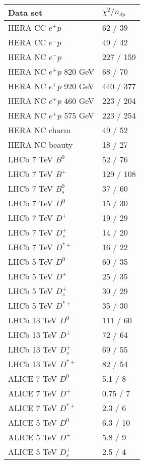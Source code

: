 \begin{table}
\renewcommand*{\arraystretch}{1.12}
    \centering
\begin{tabular}{ll}
    Data set & $\chi^2/n_{dp}$ \\
    \hline
    HERA CC $e^{+}p$ & 62 / 39  \\ 
    HERA CC $e^{-}p$ & 49 / 42  \\ 
    HERA NC $e^{-}p$ & 227 / 159  \\ 
    HERA NC $e^{+}p$ 820 GeV & 68 / 70  \\ 
    HERA NC $e^{+}p$ 920 GeV & 440 / 377  \\ 
    HERA NC $e^{+}p$ 460 GeV & 223 / 204  \\ 
    HERA NC $e^{+}p$ 575 GeV & 223 / 254  \\ 
    HERA NC charm & 49 / 52  \\ 
    HERA NC beauty & 18 / 27  \\ 
    LHCb 7 TeV $B^0$ & 52 / 76  \\ 
    LHCb 7 TeV $B^{+}$ & 129 / 108  \\ 
    LHCb 7 TeV $B^{0}_s$ & 37 / 60  \\ 
    LHCb 7 TeV $D^0$ & 15 / 30  \\ 
    LHCb 7 TeV $D^{+}$ & 19 / 29  \\ 
    LHCb 7 TeV $D^{+}_{s}$ & 14 / 20  \\ 
    LHCb 7 TeV $D^{*+}$ & 16 / 22  \\ 
    LHCb 5 TeV $D^0$ & 60 / 35  \\ 
    LHCb 5 TeV $D^{+}$ & 25 / 35  \\ 
    LHCb 5 TeV $D^{+}_{s}$ & 30 / 29  \\ 
    LHCb 5 TeV $D^{*+}$ & 35 / 30  \\ 
    LHCb 13 TeV $D^0$ & 111 / 60  \\ 
    LHCb 13 TeV $D^{+}$ & 72 / 64  \\ 
    LHCb 13 TeV $D^{+}_{s}$ & 69 / 55  \\ 
    LHCb 13 TeV $D^{*+}$ & 82 / 54  \\ 
    ALICE 7 TeV $D^0$ & 5.1 / 8  \\ 
    ALICE 7 TeV $D^{+}$ & 0.75 / 7  \\ 
    ALICE 7 TeV $D^{*+}$ & 2.3 / 6  \\ 
    ALICE 5 TeV $D^0$ & 6.3 / 10  \\ 
    ALICE 5 TeV $D^{+}$ & 5.8 / 9  \\ 
    ALICE 5 TeV $D^{+}_{s}$ & 2.5 / 4  \\ 

\end{tabular}
\end{table}
